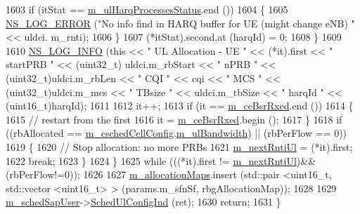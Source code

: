 \begin{DoxyCode}
1603           \textcolor{keywordflow}{if} (itStat == \hyperlink{classns3_1_1RrFfMacScheduler_a13fbe24878639869771e77ff813373ff}{m\_ulHarqProcessesStatus}.end ())
1604             \{
1605               \hyperlink{group__logging_ga0261a8db1d4ac5f79417d117634fd455}{NS\_LOG\_ERROR} (\textcolor{stringliteral}{"No info find in HARQ buffer for UE (might change eNB) "} << uldci.
      m\_rnti);
1606             \}
1607           (*itStat).second.at (harqId) = 0;
1608         \}
1609         
1610       \hyperlink{group__logging_gafbd73ee2cf9f26b319f49086d8e860fb}{NS\_LOG\_INFO} (\textcolor{keyword}{this} << \textcolor{stringliteral}{" UL Allocation - UE "} << (*it).first << \textcolor{stringliteral}{" startPRB "} << (uint32\_t)
      uldci.m\_rbStart << \textcolor{stringliteral}{" nPRB "} << (uint32\_t)uldci.m\_rbLen << \textcolor{stringliteral}{" CQI "} << cqi << \textcolor{stringliteral}{" MCS "} << (uint32\_t)uldci.m\_mcs 
      << \textcolor{stringliteral}{" TBsize "} << uldci.m\_tbSize << \textcolor{stringliteral}{" harqId "} << (uint16\_t)harqId);
1611 
1612       it++;
1613       \textcolor{keywordflow}{if} (it == \hyperlink{classns3_1_1RrFfMacScheduler_a1696bc07e1fdc0336106223f97b44298}{m\_ceBsrRxed}.end ())
1614         \{
1615           \textcolor{comment}{// restart from the first}
1616           it = \hyperlink{classns3_1_1RrFfMacScheduler_a1696bc07e1fdc0336106223f97b44298}{m\_ceBsrRxed}.begin ();
1617         \}
1618       \textcolor{keywordflow}{if} ((rbAllocated == \hyperlink{classns3_1_1RrFfMacScheduler_a809c6237863709f97fc450b1a2ba60d4}{m\_cschedCellConfig}.\hyperlink{structns3_1_1FfMacCschedSapProvider_1_1CschedCellConfigReqParameters_a5ab5b102878e6e7e7727a14af4a64d2f}{m\_ulBandwidth}) || (rbPerFlow ==
       0))
1619         \{
1620           \textcolor{comment}{// Stop allocation: no more PRBs}
1621           \hyperlink{classns3_1_1RrFfMacScheduler_afd1cdb17c29e2a04980e4bea7d537e0f}{m\_nextRntiUl} = (*it).first;
1622           \textcolor{keywordflow}{break};
1623         \}
1624     \}
1625   \textcolor{keywordflow}{while} (((*it).first != \hyperlink{classns3_1_1RrFfMacScheduler_afd1cdb17c29e2a04980e4bea7d537e0f}{m\_nextRntiUl})&&(rbPerFlow!=0));
1626 
1627   \hyperlink{classns3_1_1RrFfMacScheduler_a9554a5b41b05461bdbcd12dcdecb34ea}{m\_allocationMaps}.insert (std::pair <uint16\_t, std::vector <uint16\_t> > (params.m\_sfnSf, 
      rbgAllocationMap));
1628 
1629   \hyperlink{classns3_1_1RrFfMacScheduler_a1d834e008836f5b748b81d8d3dc5f926}{m\_schedSapUser}->\hyperlink{classns3_1_1FfMacSchedSapUser_a1b89636256701a84d990db7db8aea874}{SchedUlConfigInd} (ret);
1630   \textcolor{keywordflow}{return};
1631 \}
\end{DoxyCode}


